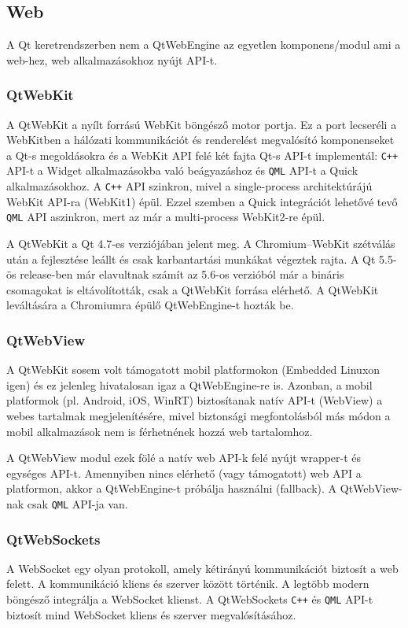 \documentclass[12pt]{report}
\begin{document}
\subsection{Web}
A Qt keretrendszerben nem a QtWebEngine az egyetlen komponens/modul ami a
web-hez, web alkalmazásokhoz nyújt API-t.

\subsubsection{QtWebKit}
A QtWebKit a nyílt forrású WebKit böngésző motor portja. Ez a port lecseréli a WebKitben
a hálózati kommunikációt és renderelést megvalósító komponenseket a Qt-s megoldásokra és
a WebKit API felé két fajta Qt-s API-t implementál:
\texttt{C++} API-t a Widget alkalmazásokba való beágyazáshoz és \texttt{QML} API-t a Quick
alkalmazásokhoz.
A \texttt{C++} API szinkron, mivel a single-process architektúrájú WebKit API-ra (WebKit1)
épül. Ezzel szemben a Quick integrációt lehetővé tevő \texttt{QML} API aszinkron, mert az már
a multi-process WebKit2-re épül.

A QtWebKit a Qt 4.7-es verziójában jelent meg. A Chromium--WebKit szétválás után a
fejlesztése leállt és csak karbantartási munkákat végeztek rajta. A Qt 5.5-ös release-ben
már elavultnak számít az 5.6-os verzióból már a bináris csomagokat is eltávolították, csak
a QtWebKit forrása elérhető. A QtWebKit leváltására a Chromiumra épülő QtWebEngine-t
hozták be.

\subsubsection{QtWebView}
A QtWebKit sosem volt támogatott mobil platformokon (Embedded Linuxon igen) és ez jelenleg
hivatalosan igaz a QtWebEngine-re is. Azonban, a mobil platformok (pl. Android, iOS, WinRT)
biztosítanak natív API-t (WebView) a webes tartalmak megjelenítésére, mivel biztonsági
megfontolásból más módon a mobil alkalmazások nem is férhetnének hozzá web tartalomhoz.

A QtWebView modul ezek fölé a natív web API-k felé nyújt wrapper-t és egységes API-t.
Amennyiben nincs elérhető (vagy támogatott) web API a platformon, akkor a QtWebEngine-t
próbálja használni (fallback). A QtWebView-nak csak \texttt{QML} API-ja van.
\cite{bib:qt-doc-qt-webview}

\subsubsection{QtWebSockets}
A WebSocket egy olyan protokoll, amely kétirányú kommunikációt biztosít a web felett.
A kommunikáció kliens és szerver között történik.
A legtöbb modern böngésző integrálja a WebSocket klienst. A QtWebSockets \texttt{C++} és
\texttt{QML} API-t biztosít mind WebSocket kliens és szerver megvalósításához.
\cite{bib:qt-doc-qt-websockets}
\end{document}
